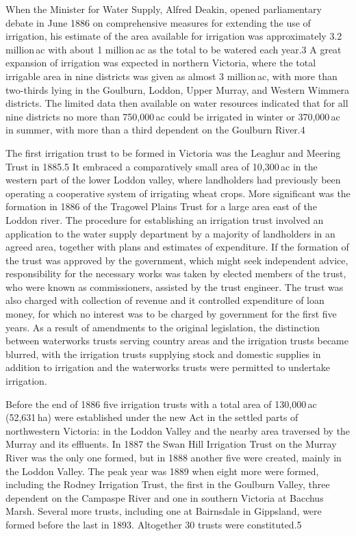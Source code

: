 When the Minister for Water Supply, Alfred Deakin, opened
parliamentary debate in June 1886 on comprehensive measures for
extending the use of irrigation, his estimate of the area available
for irrigation was approximately 3.2 million\,ac with about 1
million\,ac as the total to be watered each year.3 A great expansion
of irrigation was expected in northern Victoria, where the total
irrigable area in nine districts was given as almost 3 million\,ac,
with more than two-thirds lying in the Goulburn, Loddon, Upper Murray,
and Western Wimmera districts. The limited data then available on
water resources indicated that for all nine districts no more than
750,000\,ac could be irrigated in winter or 370,000\,ac in summer, with
more than a third dependent on the Goulburn River.4

The first irrigation trust to be formed in Victoria was the Leaghur
and Meering Trust in 1885.5 It embraced a comparatively small area of
10,300\,ac in the western part of the lower Loddon valley, where
landholders had previously been operating a cooperative system of
irrigating wheat crops. More significant was the formation in 1886 of
the Tragowel Plains Trust for a large area east of the Loddon
river. The procedure for establishing an irrigation trust involved an
application to the water supply department by a majority of
landholders in an agreed area, together with plans and estimates of
expenditure. If the formation of the trust was approved by the
government, which might seek independent advice, responsibility for
the necessary works was taken by elected members of the trust, who
were known as commissioners, assisted by the trust engineer. The trust
was also charged with collection of revenue and it controlled
expenditure of loan money, for which no interest was to be charged by
government for the first five years. As a result of amendments to the
original legislation, the distinction between waterworks trusts
serving country areas and the irrigation trusts became blurred, with
the irrigation trusts supplying stock and domestic supplies in
addition to irrigation and the waterworks trusts were permitted to
undertake irrigation.

Before the end of 1886 five irrigation trusts with a total area of
130,000\,ac (52,631\,ha) were established under the new Act in the
settled parts of northwestern Victoria: in the Loddon Valley and the
nearby area traversed by the Murray and its effluents. In 1887 the
Swan Hill Irrigation Trust on the Murray River was the only one
formed, but in 1888 another five were created, mainly in the Loddon
Valley.  The peak year was 1889 when eight more were formed, including
the Rodney Irrigation Trust, the first in the Goulburn Valley, three
dependent on the Campaspe River and one in southern Victoria at
Bacchus Marsh.  Several more trusts, including one at Bairnsdale in
Gippsland, were formed before the last in 1893.  Altogether 30 trusts
were constituted.5

